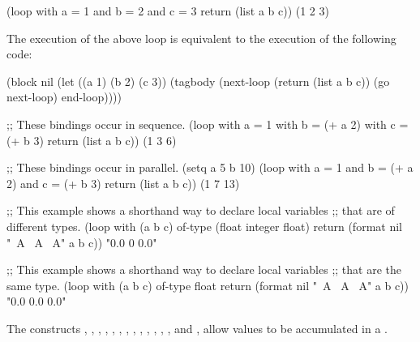 \code
 (loop with a = 1 
       and b = 2 
       and c = 3
       return (list a b c))
\EV (1 2 3)
\endcode
 
The execution of the above loop is equivalent to the execution of
the following code:
 
\code
 (block nil
   (let ((a 1)
         (b 2)
         (c 3))
     (tagbody
         (next-loop (return (list a b c))
                    (go next-loop)
                    end-loop))))
\endcode
{}


\code
;; These bindings occur in sequence.
 (loop with a = 1 
       with b = (+ a 2) 
       with c = (+ b 3)
       return (list a b c))
\EV (1 3 6)
 
;; These bindings occur in parallel.
 (setq a 5 b 10)
 (loop with a = 1
       and b = (+ a 2)
       and c = (+ b 3)
       return (list a b c))
\EV (1 7 13)
 
;; This example shows a shorthand way to declare local variables 
;; that are of different types.
 (loop with (a b c) of-type (float integer float)
       return (format nil "~A ~A ~A" a b c))
\EV "0.0 0 0.0"
 
;; This example shows a shorthand way to declare local variables 
;; that are the same type.
 (loop with (a b c) of-type float 
       return (format nil "~A ~A ~A" a b c))
\EV "0.0 0.0 0.0"
\endcode

\endsubsubsubsection%

\endsubsubsection%

\endsubsection%

 

The constructs , ,
, ,
, ,
, ,
, ,
, ,
, and ,
allow values to be accumulated in a .
 
 
 
